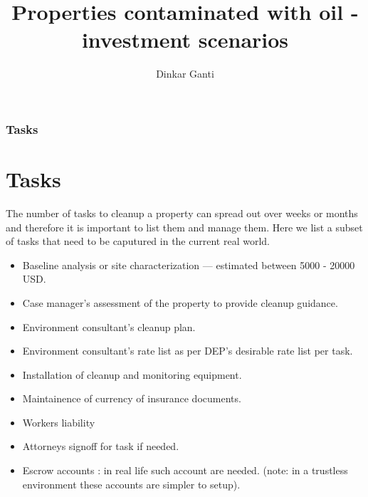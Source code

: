 \documentclass{beamer}
\title{Properties contaminated with oil - investment scenarios}
\author{Dinkar Ganti}
\begin{document}
\begin{frame}
  \titlepage
\end{frame}
\begin{frame}
\frametitle{Tasks}
\section{Tasks}
  The number of tasks to cleanup a property can spread out over weeks or months and therefore it is important to list them and manage them. Here we list a subset of tasks that need to be caputured in the current real world.
  \begin{itemize}
    \item Baseline analysis or site characterization --- estimated between 5000 - 20000 USD.
    \item Case manager's assessment of the property to provide cleanup guidance.
    \item Environment consultant's cleanup plan.
    \item Environment consultant's rate list as per DEP's desirable rate list per task. 
    \item Installation of cleanup and monitoring equipment.
    \item Maintainence of currency of insurance documents.
    \item Workers liability
    \item Attorneys signoff for task if needed.
    \item Escrow accounts : in real life such account are needed. (note: in a trustless environment these accounts are simpler to setup).
  \end{itemize}
\end{frame}
\end{document}
